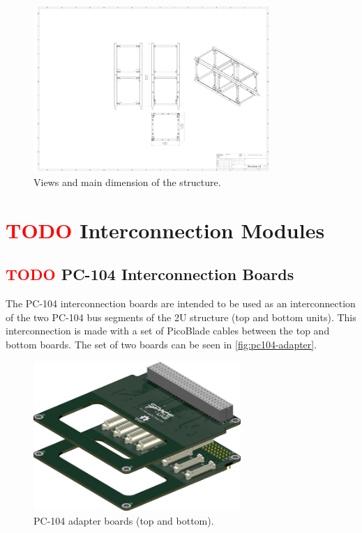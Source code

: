 \begin{figure}[H]
	\begin{center}
		\includegraphics[width=0.8\textwidth, trim=25cm 8cm 30cm 13cm, clip=true]{figures/subsystems/Structure U2.pdf}
		\caption{Views and main dimension of the structure.}
		\label{fig:structure_views}
	\end{center}
\end{figure}

\section{ \textcolor{red}{TODO} Interconnection Modules}

\subsection{ \textcolor{red}{TODO} PC-104 Interconnection Boards}

The PC-104 interconnection boards are intended to be used as an interconnection of the two PC-104 bus segments of the 2U structure (top and bottom units). This interconnection is made with a set of PicoBlade cables between the top and bottom boards. The set of two boards can be seen in \autoref{fig:pc104-adapter}.

\begin{figure}[!ht]
    \begin{center}
        \includegraphics[width=0.7\textwidth]{figures/subsystems/pc104-adapter}
        \caption{PC-104 adapter boards (top and bottom).}
        \label{fig:pc104-adapter}
    \end{center}
\end{figure}

